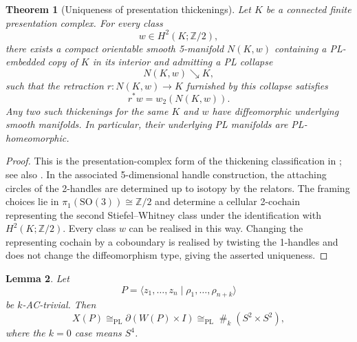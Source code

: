 \documentclass[a4paper,11pt,reqno]{amsart}
\newtheorem{theorem}{Theorem}
\newtheorem{lemma}[theorem]{Lemma}
\theoremstyle{definition}
\theoremstyle{remark}
\newcommand{\PL}{\mathrm{PL}}
\newcommand{\cs}{\mathbin{\#}}
\begin{document}
	\begin{theorem}[Uniqueness of presentation thickenings]\label{thm:thickening-classification} 
		Let $K$ be a connected finite presentation complex. For every class
		\[
		w\in H^2(K;\mathbb Z/2),
		\]
		there exists a compact orientable smooth 5-manifold $N(K,w)$ containing a PL-embedded copy of $K$ in its interior and admitting a PL collapse
		\[
		N(K,w)\searrow K,
		\]
		such that the retraction $r:N(K,w)\to K$ furnished by this collapse satisfies
		\[
		r^*w=w_2(N(K,w)).
		\]
		Any two such thickenings for the same $K$ and $w$ have diffeomorphic underlying smooth manifolds. In particular, their underlying PL manifolds are PL-homeomorphic.
	\end{theorem}
	\begin{proof}
		This is the presentation-complex form of the thickening classification in \cite[Lemma~3.3]{HKT}; see also \cite{WallThickenings}. In the associated 5-dimensional handle construction, the attaching circles of the 2-handles are determined up to isotopy by the relators. The framing choices lie in $\pi_1(\mathrm{SO}(3))\cong\mathbb Z/2$ and determine a cellular 2-cochain representing the second Stiefel–Whitney class under the identification with $H^2(K;\mathbb Z/2)$. Every class $w$ can be realised in this way. Changing the representing cochain by a coboundary is realised by twisting the 1-handles and does not change the diffeomorphism type, giving the asserted uniqueness.
	\end{proof}
	
	\begin{lemma}
		\label{lem:AC-standard-double}
		Let
		\[
		P=\langle z_1,\dots,z_n\mid\rho_1,\dots,\rho_{n+k}\rangle
		\]
		be $k$-AC-trivial. Then
		\[ X(P)\cong_{\mathrm{PL}}\partial(W(P)\times I)\cong_{\PL}\cs_k(S^2\times S^2), \]
		where the $k=0$ case means $S^4$.
	\end{lemma}
	
\end{document}
